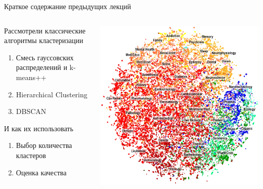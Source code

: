 \documentclass[aspectratio=169]{beamer}
\begin{document}
\begin{frame}{Краткое содержание предыдущих лекций}

\begin{columns}[]
    \begin{column}{.4\textwidth}
    	Рассмотрели классические алгоритмы кластеризации
		\begin{enumerate}
			\item Смесь гауссовских распределений и k-means++
			\item Hierarchical Clustering
			\item DBSCAN
		\end{enumerate}    	
		И как их использовать
		\begin{enumerate}
			\item Выбор количества кластеров
			\item Оценка качества
		\end{enumerate}
		
    \end{column}
       
    \begin{column}{.6\textwidth}
    \vspace{-0em}
	\begin{center}
   		\includegraphics[width=\textwidth]{images/medical.png}
    \end{center}
    \end{column}
  \end{columns}

\end{frame}
\end{document}
